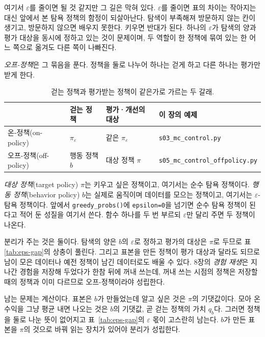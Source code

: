 \documentclass[11pt,a4paper]{article}
\begin{document}
여기서 $\varepsilon$를 줄이면 될 것 같지만 그 길은 막혀 있다. $\varepsilon$를 줄이면 표의 차이는
작아지는 대신 앞에서 본 탐욕 정책의 함정이 되살아난다. 탐색이 부족해져 방문하지 않는 칸이
생기고, 방문하지 않으면 배우지 못한다. 키우면 반대가 된다. 하나의 $\varepsilon$가 탐색의 양과
평가 대상을 동시에 정하고 있는 것이 문제이며, 두 역할이 한 정책에 묶여 있는 한 어느 쪽으로 옮겨도
다른 쪽이 나빠진다.

\emph{오프-정책}은 그 묶음을 푼다. 정책을 둘로 나누어 하나는 걷게 하고 다른 하나는 평가만 받게
한다.

\begin{table}[htbp]
\centering
\caption{걷는 정책과 평가받는 정책이 같은가로 가르는 두 갈래.}
\label{tab:on-off}
\small
\begin{tabular}{@{}llll@{}}
\toprule
 & 걷는 정책 & 평가·개선의 대상 & 이 장의 예제 \\
\midrule
온-정책(on-policy)   & $\pi_\varepsilon$ & 같은 $\pi_\varepsilon$ & \texttt{s03\_mc\_control.py} \\
오프-정책(off-policy) & 행동 정책 $b$     & 대상 정책 $\pi$        & \texttt{s05\_mc\_control\_offpolicy.py} \\
\bottomrule
\end{tabular}
\end{table}

\emph{대상 정책}(target policy) $\pi$는 키우고 싶은 정책이고, 여기서는 순수 탐욕 정책이다.
\emph{행동 정책}(behavior policy) $b$는 실제로 움직이며 데이터를 모으는 정책이고, 여기서는
$\varepsilon$-탐욕 정책이다. 앞에서 \lstinline|greedy_probs()|에
\lstinline|epsilon=0|을 넘기면 순수 탐욕 정책이 된다고 적어 둔 성질을 여기서 쓴다. 함수 하나를 두
번 부르되 $\varepsilon$만 달리 주면 두 정책이 나온다.

분리가 주는 것은 둘이다. 탐색의 양은 $b$의 $\varepsilon$로 정하고 평가의 대상은 $\pi$로 두므로 표
\ref{tab:eps-gap}의 상충이 풀린다. 그리고 표본을 만든 정책이 평가 대상과 달라도 되므로
남이 모은 데이터나 예전 정책이 남긴 데이터로도 배울 수 있다. 8장의 \emph{경험 재생}은 지나간
경험을 저장해 두었다가 한참 뒤에 꺼내 쓰는데, 꺼내 쓰는 시점의 정책은 저장할 때의 정책과 이미
다르므로 오프-정책이라야 성립한다.

남는 문제는 계산이다. 표본은 $b$가 만들었는데 알고 싶은 것은 $\pi$의 기댓값이다. 모아 온 수익을
그냥 평균 내면 나오는 것은 $b$의 기댓값, 곧 걷는 정책의 가치 $q_b$다. 그러면 정책을 둘로 나눈 뜻이
없어지고 표~\ref{tab:eps-gap}의 $\varepsilon$ 몫이 고스란히 남는다. $b$가 만든 표본을 $\pi$의
것으로 바꿔 읽는 장치가 있어야 분리가 성립한다.
\end{document}
